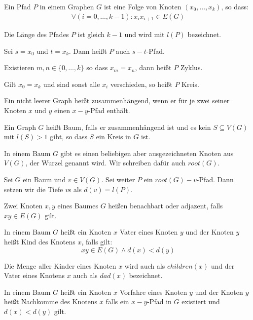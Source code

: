 \begin{definition}
Ein Pfad $P$ in einem Graphen $G$ ist eine Folge von Knoten $(x_0,\ldots,x_k)$, so dass:
\begin{align*}
	\forall (i=0,\ldots,k-1) : x_ix_{i+1} \in E(G)  
\end{align*}

Die Länge des Pfades $P$ ist gleich $k-1$ und wird mit $l(P)$ bezeichnet.\par

Sei $s=x_0$ und $t=x_k$. Dann heißt $P$ auch $s-t$-Pfad.\par

Existieren $m,n \in \{0,\ldots,k\}$ so dass $x_m = x_n$, dann heißt $P$ Zyklus. \par

Gilt $x_0 = x_k$ und sind sonst alle $x_i$ verschieden, so heißt $P$ Kreis. \par
\end{definition}

\begin{definition}[Zusammenhängend]
Ein nicht leerer Graph heißt zusammenhängend, wenn er für je zwei seiner Knoten $x$ und $y$ einen $x-y$-Pfad enthält. 
\end{definition}

\begin{definition}
Ein Graph $G$ heißt Baum, falls er zusammenhängend ist und es kein $S \subseteq V(G)$ mit $l(S) > 1$  gibt, so dass $S$ ein Kreis in $G$ ist.\par

In einem Baum $G$ gibt es einen beliebigen aber ausgezeichneten Knoten aus $V(G)$, der Wurzel genannt wird. Wir schreiben dafür auch $root(G)$.
\end{definition}

\begin{definition} 
Sei $G$ ein Baum und $v \in V(G)$. Sei weiter $P$ ein $root(G)-v$-Pfad. Dann setzen wir die Tiefe $v$s als $d(v) = l(P)$.  
\end{definition}

\begin{definition}[Verwandtschaft]
Zwei Knoten $x,y$ eines Baumes $G$ heißen benachbart oder adjazent, falls $xy \in E(G)$ gilt. \par

In einem Baum $G$ heißt ein Knoten $x$ Vater eines Knoten $y$ und der Knoten $y$ heißt Kind des Knotens $x$, falls gilt: 
\[ xy \in E(G) \wedge d(x) < d(y) \]

Die Menge aller Kinder eines Knoten $x$ wird auch als $children(x)$ und der Vater eines Knotens $x$ auch als $dad(x)$ bezeichnet. \par

In einem Baum $G$ heißt ein Knoten $x$ Vorfahre eines Knoten $y$ und der Knoten $y$ heißt Nachkomme des Knotens $x$ falls ein $x-y$-Pfad in $G$ existiert und $d(x) < d(y)$ gilt.
\end{definition}

